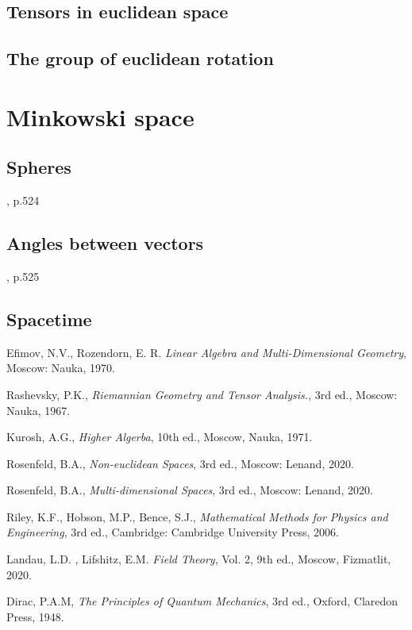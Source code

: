 \documentclass{book}
\begin{document}
\section{Tensors in euclidean space}

\section{The group of euclidean rotation}

\chapter{Minkowski space}

\section{Spheres}

\cite{rosenfeld_noneucldean}, p.524

\section{Angles between vectors}

\cite{rosenfeld_noneucldean}, p.525

\section{Spacetime}

\begin{thebibliography}{}
Efimov, N.V., Rozendorn, E. R. \emph{Linear Algebra and Multi-Dimensional Geometry}, Moscow: Nauka, 1970.

Rashevsky, P.K., \emph{Riemannian Geometry and Tensor Analysis.}, 3rd ed., Moscow: Nauka, 1967.
   
Kurosh, A.G., \emph{Higher Algerba}, 10th ed., Moscow, Nauka, 1971. 

   Rosenfeld, B.A.,  \emph{Non-euclidean Spaces}, 3rd ed., Moscow: Lenand, 2020.

Rosenfeld, B.A.,  \emph{Multi-dimensional Spaces}, 3rd ed., Moscow: Lenand, 2020.

Riley, K.F., Hobson, M.P., Bence, S.J., \emph{Mathematical Methods for Physics and Engineering}, 3rd ed., Cambridge: Cambridge University Press, 2006.

Landau, L.D. , Lifshitz, E.M. \emph{Field Theory}, Vol. 2, 9th ed., Moscow, Fizmatlit, 2020.

Dirac, P.A.M, \emph{The Principles of Quantum Mechanics}, 3rd ed., Oxford, Claredon Press, 1948.


\end{thebibliography}
\end{document}
